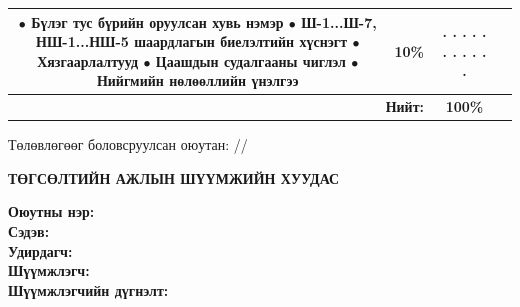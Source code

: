 \begin{titlepage}
\begin{center}
\begin{tabular}{|c|p{9.5cm}|c|c|}
\newline $\bullet$ Бүлэг тус бүрийн оруулсан хувь нэмэр
\newline $\bullet$ Ш-1...Ш-7, НШ-1...НШ-5 шаардлагын биелэлтийн хүснэгт
\newline $\bullet$ Хязгаарлалтууд
\newline $\bullet$ Цаашдын судалгааны чиглэл
\newline $\bullet$ Нийгмийн нөлөөллийн үнэлгээ & 10\% & . . . . . . . . . . . \\ \hline
\multicolumn{2}{|r|}{\textbf{Нийт:}} & \textbf{100\%} & \\ \hline
\end{tabular}

\vspace{1.5cm}
Төлөвлөгөөг боловсруулсан оюутан: \makebox[3cm]{\dotfill} /\shortname/

\end{center}

\newpage


\begin{center}
\textbf{{\large ТӨГСӨЛТИЙН АЖЛЫН ШҮҮМЖИЙН ХУУДАС}}\\[1cm]
\end{center}

\noindent \textbf{Оюутны нэр:} \shortname \\
\noindent \textbf{Сэдэв:} \ttitle \\
\noindent \textbf{Удирдагч:} \supname \\
\noindent \textbf{Шүүмжлэгч:} \readname \\

\vspace{0.5cm}
\noindent \textbf{Шүүмжлэгчийн дүгнэлт:}
\begin{framed}
\vspace{10cm} %
\end{framed}


\end{titlepage}

